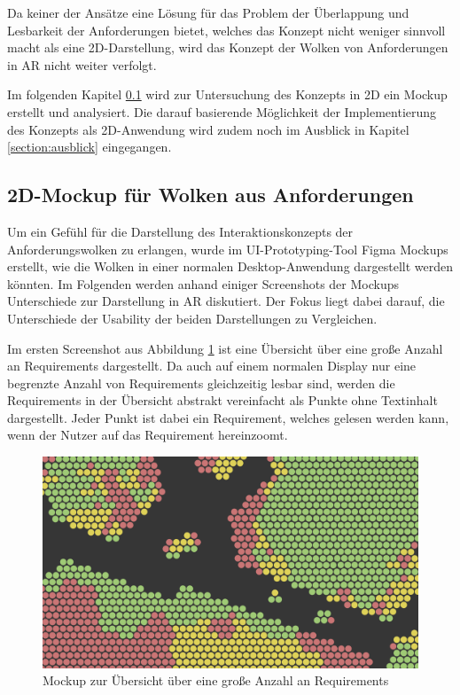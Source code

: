 Da keiner der Ansätze eine Lösung für das Problem der Überlappung und Lesbarkeit der Anforderungen bietet, welches das Konzept nicht weniger sinnvoll macht als eine 2D-Darstellung, wird das Konzept der Wolken von Anforderungen in AR nicht weiter verfolgt.

Im folgenden Kapitel \ref{section:2d} wird zur Untersuchung des Konzepts in 2D ein Mockup erstellt und analysiert.
Die darauf basierende Möglichkeit der Implementierung des Konzepts als 2D-Anwendung wird zudem noch im Ausblick in Kapitel \ref{section:ausblick} eingegangen.

\newpage

\subsection{2D-Mockup für Wolken aus Anforderungen}
\label{section:2d}

Um ein Gefühl für die Darstellung des Interaktionskonzepts der Anforderungswolken zu erlangen, wurde im UI-Prototyping-Tool Figma Mockups erstellt, wie die Wolken in einer normalen Desktop-Anwendung dargestellt werden könnten.
Im Folgenden werden anhand einiger Screenshots der Mockups Unterschiede zur Darstellung in AR diskutiert.
Der Fokus liegt dabei darauf, die Unterschiede der Usability der beiden Darstellungen zu Vergleichen.


Im ersten Screenshot aus Abbildung \ref{fig:wolken-2d-1} ist eine Übersicht über eine große Anzahl an Requirements dargestellt.
Da auch auf einem normalen Display nur eine begrenzte Anzahl von Requirements gleichzeitig lesbar sind, werden die Requirements in der Übersicht abstrakt vereinfacht als Punkte ohne Textinhalt dargestellt.
Jeder Punkt ist dabei ein Requirement, welches gelesen werden kann, wenn der Nutzer auf das Requirement hereinzoomt.

\begin{figure}[H]
    \centering
    \includegraphics[width=1\textwidth]{images/FigmaWolkenOverview.png}
    \caption{Mockup zur Übersicht über eine große Anzahl an Requirements}
    \label{fig:wolken-2d-1}
\end{figure}


